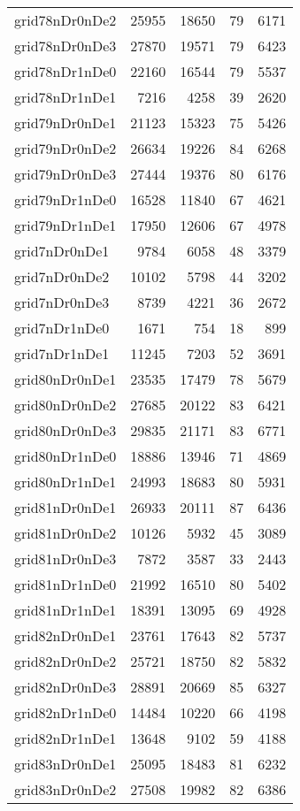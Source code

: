 \begin{longtable}{lrrrr}
grid78nDr0nDe2 & 25955 & 18650 & 79 & 6171 \\
grid78nDr0nDe3 & 27870 & 19571 & 79 & 6423 \\
grid78nDr1nDe0 & 22160 & 16544 & 79 & 5537 \\
grid78nDr1nDe1 & 7216 & 4258 & 39 & 2620 \\
grid79nDr0nDe1 & 21123 & 15323 & 75 & 5426 \\
grid79nDr0nDe2 & 26634 & 19226 & 84 & 6268 \\
grid79nDr0nDe3 & 27444 & 19376 & 80 & 6176 \\
grid79nDr1nDe0 & 16528 & 11840 & 67 & 4621 \\
grid79nDr1nDe1 & 17950 & 12606 & 67 & 4978 \\
grid7nDr0nDe1 & 9784 & 6058 & 48 & 3379 \\
grid7nDr0nDe2 & 10102 & 5798 & 44 & 3202 \\
grid7nDr0nDe3 & 8739 & 4221 & 36 & 2672 \\
grid7nDr1nDe0 & 1671 & 754 & 18 & 899 \\
grid7nDr1nDe1 & 11245 & 7203 & 52 & 3691 \\
grid80nDr0nDe1 & 23535 & 17479 & 78 & 5679 \\
grid80nDr0nDe2 & 27685 & 20122 & 83 & 6421 \\
grid80nDr0nDe3 & 29835 & 21171 & 83 & 6771 \\
grid80nDr1nDe0 & 18886 & 13946 & 71 & 4869 \\
grid80nDr1nDe1 & 24993 & 18683 & 80 & 5931 \\
grid81nDr0nDe1 & 26933 & 20111 & 87 & 6436 \\
grid81nDr0nDe2 & 10126 & 5932 & 45 & 3089 \\
grid81nDr0nDe3 & 7872 & 3587 & 33 & 2443 \\
grid81nDr1nDe0 & 21992 & 16510 & 80 & 5402 \\
grid81nDr1nDe1 & 18391 & 13095 & 69 & 4928 \\
grid82nDr0nDe1 & 23761 & 17643 & 82 & 5737 \\
grid82nDr0nDe2 & 25721 & 18750 & 82 & 5832 \\
grid82nDr0nDe3 & 28891 & 20669 & 85 & 6327 \\
grid82nDr1nDe0 & 14484 & 10220 & 66 & 4198 \\
grid82nDr1nDe1 & 13648 & 9102 & 59 & 4188 \\
grid83nDr0nDe1 & 25095 & 18483 & 81 & 6232 \\
grid83nDr0nDe2 & 27508 & 19982 & 82 & 6386 \\

\end{longtable}
